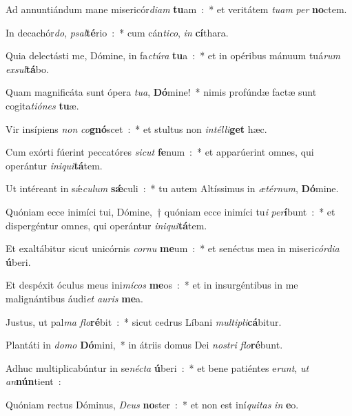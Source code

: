 ﻿\item Ad annuntiándum mane misericór\emph{di}\emph{am} \textbf{tu}am~:~* et veritátem \emph{tu}\emph{am} \emph{per} \textbf{no}ctem.
\item In decachór\emph{do}, \emph{psal}\textbf{té}rio~:~* cum cán\emph{ti}\emph{co}, \emph{in} \textbf{cí}thara.
\item Quia delectásti me, Dómine, in fa\emph{ctú}\emph{ra} \textbf{tu}a~:~* et in opéribus mánuum tuá\emph{rum} \emph{ex}\emph{sul}\textbf{tá}bo.
\item Quam magnificáta sunt ópera \emph{tu}\emph{a}, \textbf{Dó}mine!~* nimis profúndæ factæ sunt cogita\emph{ti}\emph{ó}\emph{nes} \textbf{tu}æ.
\item Vir insípiens \emph{non} \emph{co}\textbf{gnó}scet~:~* et stultus non \emph{in}\emph{tél}\emph{li}\textbf{get} hæc.
\item Cum exórti fúerint peccatóres \emph{si}\emph{cut} \textbf{fe}num~:~* et apparúerint omnes, qui operántur \emph{in}\emph{i}\emph{qui}\textbf{tá}tem.
\item Ut intéreant in sǽ\emph{cu}\emph{lum} \textbf{sǽ}culi~:~* tu autem Altíssimus in \emph{æ}\emph{tér}\emph{num}, \textbf{Dó}mine.
\item Quóniam ecce inimíci tui, Dómine,~† quóniam ecce inimíci tu\emph{i} \emph{per}\textbf{í}bunt~:~* et dispergéntur omnes, qui operántur \emph{in}\emph{i}\emph{qui}\textbf{tá}tem.
\item Et exaltábitur sicut unicórnis \emph{cor}\emph{nu} \textbf{me}um~:~* et senéctus mea in miseri\emph{cór}\emph{di}\emph{a} \textbf{ú}beri.
\item Et despéxit óculus meus ini\emph{mí}\emph{cos} \textbf{me}os~:~* et in insurgéntibus in me malignántibus áudi\emph{et} \emph{au}\emph{ris} \textbf{me}a.
\item Justus, ut pal\emph{ma} \emph{flo}\textbf{ré}bit~:~* sicut cedrus Líbani \emph{mul}\emph{ti}\emph{pli}\textbf{cá}bitur.
\item Plantáti in \emph{do}\emph{mo} \textbf{Dó}mini,~* in átriis domus Dei \emph{no}\emph{stri} \emph{flo}\textbf{ré}bunt.
\item Adhuc multiplicabúntur in se\emph{né}\emph{cta} \textbf{ú}beri~:~* et bene patiéntes e\emph{runt}, \emph{ut} \emph{an}\textbf{nún}tient~:
\item Quóniam rectus Dóminus, \emph{De}\emph{us} \textbf{no}ster~:~* et non est iní\emph{qui}\emph{tas} \emph{in} \textbf{e}o.